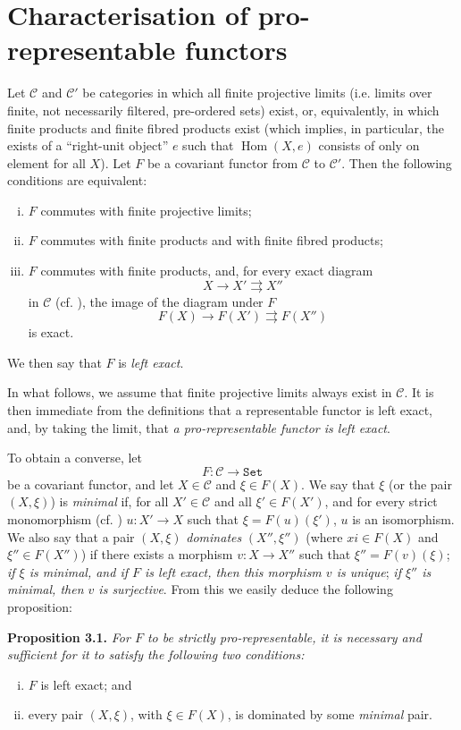 \documentclass{article}
\newenvironment{itenv}[1]
  {\phantomsection\par\medskip\noindent\textbf{#1.}\itshape}
  {\medskip}
\renewcommand{\cal}[1]{{\mathcal{#1}}}
\newcommand{\Set}{\mathtt{Set}}
\DeclareMathOperator{\Hom}{Hom}
\newcommand{\oldpage}[1]{\marginpar{\footnotesize$\Big\vert$ \textit{p.~#1}}}
\begin{document}
\section{Characterisation of pro-representable functors}
\label{A.3}

Let $\cal{C}$ and $\cal{C}'$ be categories in which all finite projective limits (i.e. limits over finite, not necessarily filtered, pre-ordered sets) exist, or, equivalently, in which finite products and finite fibred products exist (which implies, in particular, the exists of a ``right-unit object'' $e$ such that $\Hom(X,e)$ consists of only on element for all $X$).
Let $F$ be a covariant functor from $\cal{C}$ to $\cal{C}'$.
Then the following conditions are equivalent:
\begin{enumerate}[(i)]
  \item $F$ commutes with finite projective limits;
  \item $F$ commutes with finite products and with finite fibred products;
  \item $F$ commutes with finite products, and, for every exact diagram
    \[
      X\to X'\rightrightarrows X''
    \]
    in $\cal{C}$ (cf. \cite[A, Definition 2.1]{3}), the image of the diagram under $F$
    \[
      F(X)\to F(X')\rightrightarrows F(X'')
    \]
    is exact.
\end{enumerate}
We then say that $F$ is \emph{left exact}.

In what follows, we assume that finite projective limits always exist in $\cal{C}$.
It is then immediate from the definitions that a representable functor is left exact, and, by taking the limit, that \emph{a pro-representable functor is left exact}.

To obtain a converse, let
\[
  F\colon \cal{C} \to \Set
\]
be a covariant functor, and let $X\in\cal{C}$ and $\xi\in F(X)$.
We say that $\xi$ (or the pair
\oldpage{195-06}
$(X,\xi)$) is \emph{minimal} if, for all $X'\in\cal{C}$ and all $\xi'\in F(X')$, and for every strict monomorphism (cf. \cite[A, \S2]{3}) $u\colon X'\to X$ such that $\xi=F(u)(\xi')$, $u$ is an isomorphism.
We also say that a pair $(X,\xi)$ \emph{dominates} $(X'',\xi'')$ (where $xi\in F(X)$ and $\xi''\in F(X'')$) if there exists a morphism $v\colon X\to X''$ such that $\xi''=F(v)(\xi)$;
\emph{if $\xi$ is minimal, and if $F$ is left exact, then this morphism $v$ is unique};
\emph{if $\xi''$ is minimal, then $v$ is surjective}.
From this we easily deduce the following proposition:

\begin{itenv}{Proposition 3.1}
\label{A.3-proposition1}
  For $F$ to be strictly pro-representable, it is necessary and sufficient for it to satisfy the following two conditions:
  \begin{enumerate}[(i)]
    \item $F$ is left exact; and
    \item every pair $(X,\xi)$, with $\xi\in F(X)$, is dominated by some \emph{minimal} pair.
  \end{enumerate}
\end{itenv}
\end{document}
